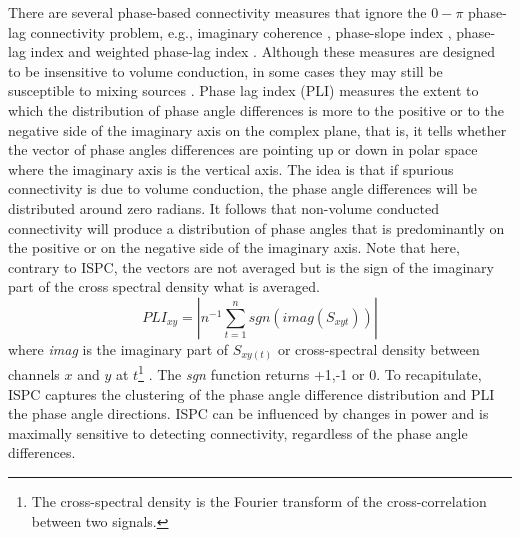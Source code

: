 \documentclass[11pt, onecolumn]{article}
\begin{document}

There are several phase-based connectivity measures that ignore the $0-\pi$ phase-lag
connectivity problem, e.g., imaginary coherence \citep{nolte2004identifying}, phase-slope index \citep{nolte2008robustly}, phase-lag index \citep{stam2007phase} and weighted phase-lag index \cite{vinck2011improved}. Although these measures are designed to be insensitive to volume conduction, in
some cases they may still be susceptible to mixing sources \citep{peraza2012volume}.
Phase lag index (PLI) measures the extent to which the distribution of phase angle differences is more to the positive or to the negative side of the imaginary axis on the complex plane, that is, it tells whether the vector of phase angles differences are pointing up or down in polar space where the imaginary axis is the vertical axis. The idea is that if spurious connectivity is due to volume conduction, the phase angle differences will be distributed around zero radians. It follows that non-volume conducted connectivity will produce a distribution of phase angles that is predominantly on the positive or on the negative side of the imaginary axis. Note that here, contrary to ISPC, the vectors are not averaged but is the sign of the imaginary part of the cross spectral density what is averaged.
\begin{equation}
PLI_{xy} = |n^{-1} \sum_{t=1}^{n}sgn(imag(S_{xyt}))|
\label{eq:pli}
\end{equation}
where \textit{imag} is the imaginary part of $S_{xy(t)}$ or cross-spectral density between channels $x$ and $y$ at $t$\footnote{The cross-spectral density is the Fourier transform of the cross-correlation between two signals.} \citep{lachaux1999measuring}. The \textit{sgn} function returns +1,-1 or 0. %
To recapitulate, ISPC captures the clustering of the phase angle difference distribution and PLI the phase angle directions. ISPC can be influenced by changes in power and is maximally sensitive to detecting connectivity, regardless of the phase angle differences. 
\end{document}
